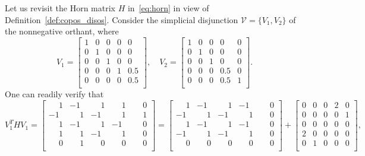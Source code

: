 \documentclass[12pt]{article}
\newcommand{\mcV}{\mathcal{V}}
\theoremstyle{remark}
\begin{document}
Let us revisit the Horn matrix $H$ in~\eqref{eq:horn} in view of Definition~\ref{def:copos_disos}. 
Consider the simplicial disjunction $\mcV=\{V_1,V_2\}$ of the nonnegative orthant, where
\[V_1=\begin{bmatrix}
     1   & 0&    0&     0&   0\\
    0 &    1&     0&    0&     0\\
   0&   0&     1&   0&     0\\
    0 &   0&    0&     1&    0.5\\
    0 &    0&     0&    0&     0.5\\
\end{bmatrix}, \quad 
V_2=\begin{bmatrix}     
     1   & 0&    0&     0&   0\\
    0 &    1&     0&    0&     0\\
   0&   0&     1&   0&     0\\
    0 &   0&    0&     0.5&    0\\
    0 &    0&     0&    0.5&     1\\ \end{bmatrix}.\]
One can readily verify that
\[
V_1^THV_1=\begin{bmatrix}
    \phantom{-}1 & -1            & \phantom{-}1  & \phantom{-}1  & \phantom{-}0 \\
    -1            & \phantom{-}1  & -1            & \phantom{-}1  & \phantom{-}1 \\
    \phantom{-}1 & -1            & \phantom{-}1  & -1            & \phantom{-}0 \\
    \phantom{-}1 & \phantom{-}1  & -1            & \phantom{-}1  & \phantom{-}0 \\
    \phantom{-}0 & \phantom{-}1  & \phantom{-}0  & \phantom{-}0  & \phantom{-}0 \\
\end{bmatrix}=\begin{bmatrix}
    \phantom{-}1 & -1            & \phantom{-}1  & -1            & \phantom{-}0 \\
    -1            & \phantom{-}1  & -1            & \phantom{-}1  & \phantom{-}0 \\
    \phantom{-}1 & -1            & \phantom{-}1  & -1            & \phantom{-}0 \\
    -1            & \phantom{-}1  & -1            & \phantom{-}1  & \phantom{-}0 \\
    \phantom{-}0 & \phantom{-}0  & \phantom{-}0  & \phantom{-}0  & \phantom{-}0 \\
\end{bmatrix}+\begin{bmatrix}
     0 & 0 & 0 & 2 & 0 \\
     0 & 0 & 0 & 0 & 1 \\
     0 & 0 & 0 & 0 & 0 \\
     2 & 0 & 0 & 0 & 0 \\
     0 & 1 & 0 & 0 & 0 \\
\end{bmatrix},
\]
\end{document}
